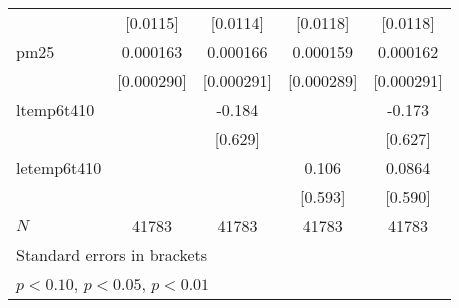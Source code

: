 {\begin{tabular}{l*{4}{c}}
            &    [0.0115]         &    [0.0114]         &    [0.0118]         &    [0.0118]         \\
[1em]
pm25        &    0.000163         &    0.000166         &    0.000159         &    0.000162         \\
            &  [0.000290]         &  [0.000291]         &  [0.000289]         &  [0.000291]         \\
[1em]
ltemp6t410  &                     &      -0.184         &                     &      -0.173         \\
            &                     &     [0.629]         &                     &     [0.627]         \\
[1em]
letemp6t410 &                     &                     &       0.106         &      0.0864         \\
            &                     &                     &     [0.593]         &     [0.590]         \\
\hline
\(N\)       &       41783         &       41783         &       41783         &       41783         \\
\hline\hline
\multicolumn{5}{l}{\footnotesize Standard errors in brackets}\\
\multicolumn{5}{l}{\footnotesize \sym{*} \(p<0.10\), \sym{**} \(p<0.05\), \sym{***} \(p<0.01\)}\\
\end{tabular}
}
